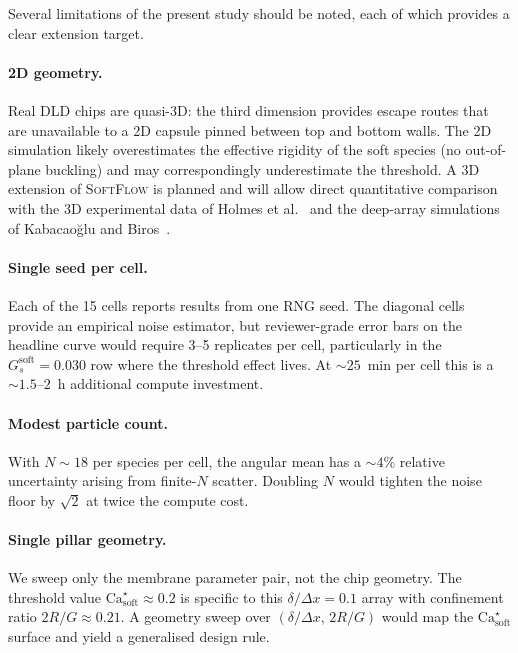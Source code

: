 \documentclass[11pt,a4paper]{article}
\begin{document}
Several limitations of the present study should be noted, each of
which provides a clear extension target.

\paragraph{2D geometry.}  Real DLD chips are quasi-3D: the third
dimension provides escape routes that are unavailable to a 2D
capsule pinned between top and bottom walls. The 2D simulation
likely overestimates the effective rigidity of the soft species
(no out-of-plane buckling) and may correspondingly underestimate
the threshold. A 3D extension of \textsc{SoftFlow} is planned and
will allow direct quantitative comparison with the 3D experimental
data of Holmes et al.~\citep{holmes2014separation} and the
deep-array simulations of Kabacao{\u{g}}lu and
Biros~\citep{kabacaoglu2018sorting}.

\paragraph{Single seed per cell.} Each of the 15 cells reports
results from one RNG seed. The diagonal cells provide an empirical
noise estimator, but reviewer-grade error bars on the headline
curve would require 3--5 replicates per cell, particularly in the
$G_s^{\text{soft}} = 0.030$ row where the threshold effect lives.
At $\sim 25$~min per cell this is a $\sim 1.5$--$2$~h additional
compute investment.

\paragraph{Modest particle count.} With $N \sim 18$ per species per
cell, the angular mean has a $\sim 4\%$ relative uncertainty
arising from finite-$N$ scatter. Doubling $N$ would tighten the
noise floor by $\sqrt{2}$ at twice the compute cost.

\paragraph{Single pillar geometry.} We sweep only the membrane
parameter pair, not the chip geometry. The threshold value
$\mathrm{Ca}_{\text{soft}}^\star \approx 0.2$ is specific to this
$\delta/\Delta x = 0.1$ array with confinement ratio
$2R/G \approx 0.21$. A geometry sweep over
$(\delta/\Delta x,\,2R/G)$ would map the
$\mathrm{Ca}_{\text{soft}}^\star$ surface and yield a generalised
design rule.
\end{document}
